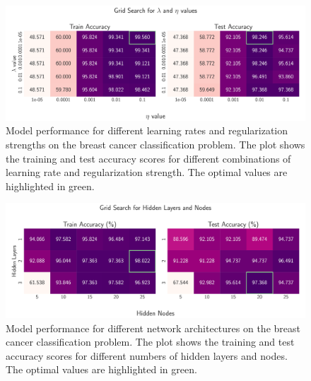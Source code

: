 \documentclass[aps,pra,english,notitlepage,reprint,nofootinbib]{revtex4-1}  %
\begin{document}
\begin{onecolumngrid}
    \begin{figure}[h!]
        \centering
        \includegraphics[width = .9\textwidth]{../figs/classification_lambda_eta.pdf}
        \caption{Model performance for different learning rates and regularization strengths on the breast cancer classification problem. The plot shows the training and test accuracy scores for different combinations of learning rate and regularization strength. The optimal values are highlighted in green.}
    \end{figure}
\end{onecolumngrid}

\begin{onecolumngrid}
    \begin{figure}[h!]
        \centering
        \includegraphics[width = .9\textwidth]{../figs/classification_hidden_layers_nodes.pdf}
        \caption{Model performance for different network architectures on the breast cancer classification problem. The plot shows the training and test accuracy scores for different numbers of hidden layers and nodes. The optimal values are highlighted in green.}
        \label{fig:NN_Classification_hidden_layers_nodes}
    \end{figure}
\end{onecolumngrid}
\end{document}
